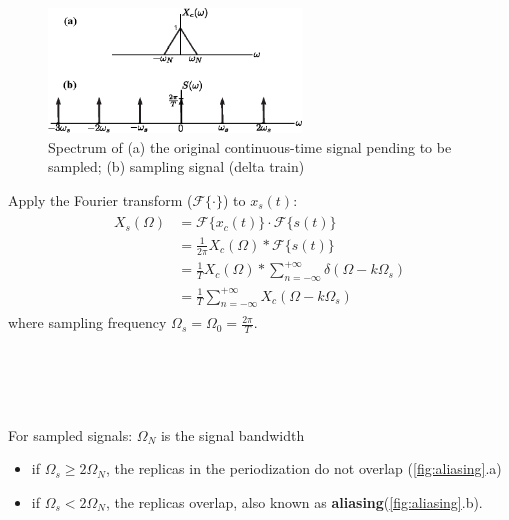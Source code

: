 \begin{minipage}{\textwidth}
\begin{figure}
    \includegraphics[width = 0.6\textwidth]{images/sample_signal_delta_train.eps}
    \caption{Spectrum of (a) the original continuous-time signal pending to be sampled; (b) sampling signal (delta train)}
    \label{fig:original_signal}
\end{figure}
Apply the Fourier transform ($\mathcal{F}\{\cdot\}$) to $x_{s}(t)$:
\begin{align*} 
\begin{split}
    X_{s}(\Omega) 
    & = \mathcal{F}\{x_{c}(t)\} \cdot \mathcal{F}\{s(t)\}\\
    & = \frac{1}{2\pi} X_{c}(\Omega) * \mathcal{F}\{s(t)\} \\
    & = \frac{1}{T} X_{c}(\Omega) * \sum_{n=-\infty}^{+\infty} \delta (\Omega - k \Omega_{s})\\
    & = \boxed{\frac{1}{T} \sum_{n=-\infty}^{+\infty}  X_{c}(\Omega - k \Omega_{s})}
\end{split} 
\end{align*}
where sampling frequency $\Omega_{s}=\Omega_{0}=\frac{2\pi}{T}$.
\end{minipage}
\ \\\\\\\\
For sampled signals: $\Omega_{N}$ is the signal bandwidth
\begin{itemize}
    \item if $\Omega_{s} \geq 2\Omega_{N}$, the replicas in the periodization do not overlap (\autoref{fig:aliasing}.a)
    \item if $\Omega_{s} < 2\Omega_{N}$, the replicas overlap, also known as \textbf{aliasing}(\autoref{fig:aliasing}.b).
\end{itemize} 

